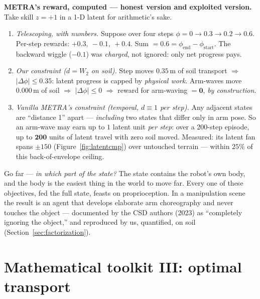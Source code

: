 \documentclass[11pt,a4paper]{article}
\begin{document}
\begin{worked}
\textbf{METRA's reward, computed --- honest version and exploited version.}
Take skill $z = +1$ in a 1-D latent for arithmetic's sake.
\begin{enumerate}[leftmargin=6mm, itemsep=0mm]
\item \emph{Telescoping, with numbers.} Suppose over four steps
$\phi = 0 \to 0.3 \to 0.2 \to 0.6$. Per-step rewards:
$+0.3,\ -0.1,\ +0.4$. Sum $= \mathbf{0.6} = \phi_{\text{end}} -
\phi_{\text{start}}$. The backward wiggle ($-0.1$) was \emph{charged}, not
ignored: only net progress pays.
\item \emph{Our constraint ($d = W_2$ on soil).} Step moves $0.35$\,m of soil
transport $\Rightarrow$ $|\Delta\phi| \le 0.35$: latent progress is capped by
\emph{physical work}. Arm-waves move $0.000$\,m of soil $\Rightarrow$
$|\Delta\phi| \le 0$ $\Rightarrow$ reward for arm-waving
$= \mathbf{0}$, \emph{by construction}.
\item \emph{Vanilla METRA's constraint (temporal, $d \equiv 1$ per step).}
Any adjacent states are ``distance 1'' apart --- \emph{including} two states
that differ only in arm pose. So an arm-wave may earn up to $1$ latent unit
\emph{per step}: over a 200-step episode, up to $\mathbf{200}$ units of
latent travel with zero soil moved. Measured: its latent fan spans
$\pm 150$ (Figure~\ref{fig:latentcmp}) over untouched terrain --- within
$25\%$ of this back-of-envelope ceiling.
\end{enumerate}
\end{worked}

\begin{pitfall}
Go far --- \emph{in which part of the state?} The state contains the robot's own
body, and the body is the easiest thing in the world to move far. Every one of
these objectives, fed the full state, feasts on proprioception. In a
manipulation scene the result is an agent that develops elaborate arm
choreography and never touches the object --- documented by the CSD authors
(2023) as ``completely ignoring the object,'' and reproduced by us, quantified,
on soil (Section~\ref{sec:factorization}).
\end{pitfall}

\section{Mathematical toolkit III: optimal transport}
\label{sec:ot}
\end{document}
